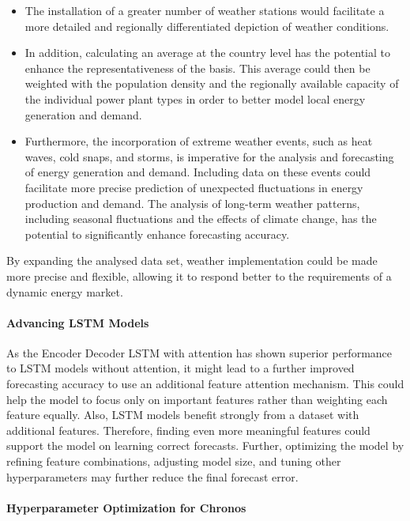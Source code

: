 \documentclass[a4paper]{article}
\begin{document}
\begin{itemize}
\item
  The installation of a greater number of weather stations would
  facilitate a more detailed and regionally differentiated depiction of
  weather conditions.
\item
  In addition, calculating an average at the country level has the
  potential to enhance the representativeness of the basis. This average
  could then be weighted with the population density and the regionally
  available capacity of the individual power plant types in order to
  better model local energy generation and demand.
\item
  Furthermore, the incorporation of extreme weather events, such as heat
  waves, cold snaps, and storms, is imperative for the analysis and
  forecasting of energy generation and demand. Including data on these
  events could facilitate more precise prediction of unexpected
  fluctuations in energy production and demand. The analysis of
  long-term weather patterns, including seasonal fluctuations and the
  effects of climate change, has the potential to significantly enhance
  forecasting accuracy.
\end{itemize}

By expanding the analysed data set, weather implementation could be made
more precise and flexible, allowing it to respond better to the
requirements of a dynamic energy market.

    \paragraph{Advancing LSTM Models}\label{advancing-lstm-models}

As the Encoder Decoder LSTM with attention has shown superior
performance to LSTM models without attention, it might lead to a further
improved forecasting accuracy to use an additional feature attention
mechanism. This could help the model to focus only on important features
rather than weighting each feature equally. Also, LSTM models benefit
strongly from a dataset with additional features. Therefore, finding
even more meaningful features could support the model on learning
correct forecasts. Further, optimizing the model by refining feature
combinations, adjusting model size, and tuning other hyperparameters may
further reduce the final forecast error.

    \paragraph{Hyperparameter Optimization for
Chronos}\label{hyperparameter-optimization-for-chronos}
\end{document}
